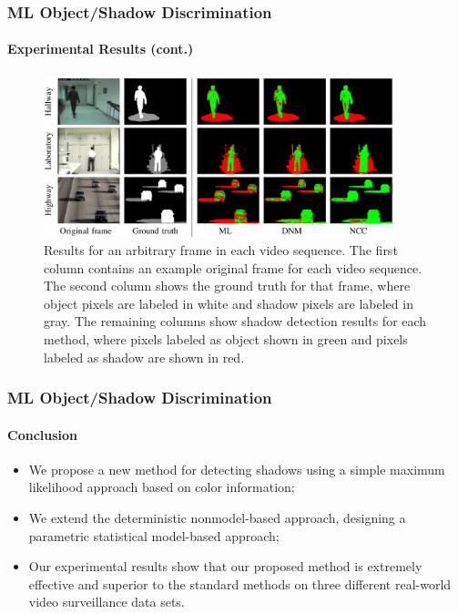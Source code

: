 
\begin{frame}
    \frametitle{ML Object/Shadow Discrimination} 
    \framesubtitle{Experimental Results (cont.)} 

    \begin{figure}
        \centering
        \includegraphics[width=4in]{figures/shadow-detection-results-for-an-arbitrary-frame.png}
        \vspace{-0.1in}
        \caption{Results for an arbitrary frame in each video sequence. The
            first column contains an example original frame for each video
            sequence. The second column shows the ground truth for that frame,
            where object pixels are labeled in white and shadow pixels are
            labeled in gray. The remaining columns show shadow detection
            results for each method, where pixels labeled as object shown in
            green and pixels labeled as shadow are shown in red.}
        \label{fig:results-for-arbitrary-frame}
    \end{figure}

\end{frame}


\begin{frame}
    \frametitle{ML Object/Shadow Discrimination}
    \framesubtitle{Conclusion}

    \begin{itemize}
        \item We propose a new method for detecting shadows using a simple 
            maximum likelihood approach based on color information;
        \item We extend the deterministic nonmodel-based approach, designing 
            a parametric statistical model-based approach;
        \item Our experimental results show that our proposed method is 
            extremely effective and superior to the standard methods on three 
            different real-world video surveillance data sets.
    \end{itemize}

\end{frame}

